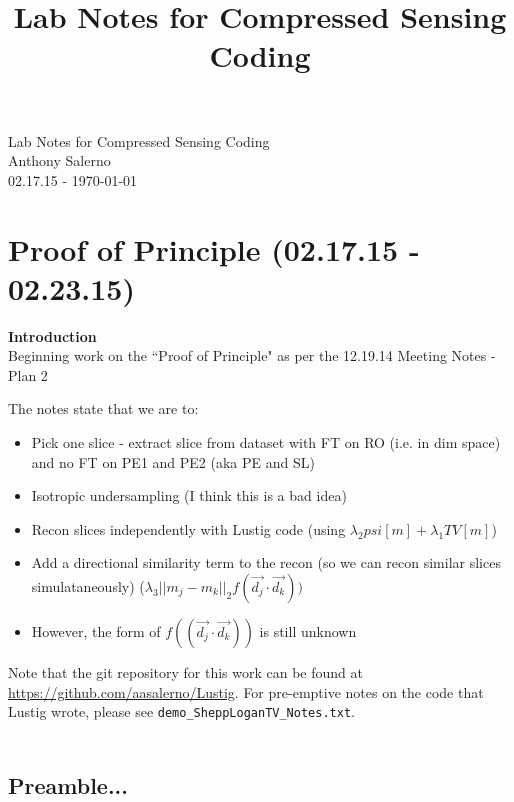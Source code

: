 \documentclass[11 pt]{article}
\title{Lab Notes for Compressed Sensing Coding}
\newcommand{\bo}{\noindent\textbf}
\let\oldsection\section
\renewcommand\section{\clearpage\newpage\oldsection}
\begin{document}
\vfill

  \begin{titlepage}
    \vspace*{\fill}
    \begin{center}
      {\huge {Lab Notes for Compressed Sensing Coding}}\\[0.5cm]
      {\large {Anthony Salerno}}\\[0.4cm]
      02.17.15 - \today
    \end{center}
    \vspace*{\fill}
  \end{titlepage}

\clearpage
\newpage

\tableofcontents

\newpage

\section{Proof of Principle (02.17.15 - 02.23.15)}

\bo{Introduction}\\
Beginning work on the ``Proof of Principle" as per the 12.19.14 Meeting Notes - Plan 2

The notes state that we are to:
\begin{itemize}
  \item Pick one slice - extract slice from dataset with FT on RO (i.e. in dim space) and no FT on PE1 and PE2 (aka PE and SL)
  \item Isotropic undersampling (I think this is a bad idea)
  \item Recon slices independently with Lustig code (using $\lambda_2 psi[m] + \lambda_1 TV[m]$)
  \item Add a directional similarity term to the recon (so we can recon similar slices simulataneously) ($\lambda_3 ||m_j - m_k||_2 f(\vec{d_j} \cdot \vec{d_k}))$
  \item However, the form of $f((\vec{d_j}\cdot \vec{d_k}))$ is still unknown
\end{itemize}

\noindent Note that the git repository for this work can be found at \url{https://github.com/aasalerno/Lustig}. For pre-emptive notes on the code that Lustig wrote, please see \verb!demo_SheppLoganTV_Notes.txt!. \\ \\

\subsection{Preamble...}
\end{document}
